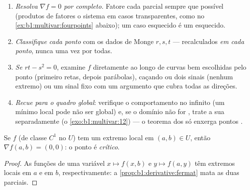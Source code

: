 \begin{method}
\label{met:b1:multivar:extremamethod}
\begin{enumerate}
  \item \emph{Resolva $\nabla f = 0$ por completo.} Fatore cada parcial sempre
        que possível (produtos de fatores   o sistema
        em casos transparentes, como no \cref{ex:b1:multivar:fourpoints} abaixo); um caso
        esquecido é um  esquecido.
  \item \emph{Classifique cada ponto} com os dados de Monge $r, s,
        t$ ---
        recalculados \emph{em cada ponto}, nunca uma vez por todas.
  \item \emph{Se $rt - s^2 = 0$}, examine $f$ diretamente ao longo de curvas
        bem escolhidas pelo ponto (primeiro retas, depois parábolas),
        caçando ou dois sinais (nenhum extremo) ou um sinal fixo com
        um argumento que cubra todas as direções.
  \item \emph{Recue para o quadro global}: verifique o comportamento
        no infinito (um mínimo local pode não ser global) e, se o
        domínio não for , trate a sua  separadamente
        (o \cref{exo:b1:multivar:12}) --- o teorema dos  só enxerga pontos
        .
\end{enumerate}
\end{method}

\begin{theorem}\label{thm:b1:multivar:critical}
Se $f$ (de classe $C^1$ no  $U$) tem um extremo local em $(a,b)
\in U$,
então $\nabla f(a,b) = (0,0)$: o ponto é \emph{crítico}.
\end{theorem}

\begin{proof}
As funções de uma variável $x \mapsto f(x, b)$ e $y \mapsto f(a,
y)$ têm extremos locais
 em $a$ e em $b$, respectivamente: a \cref{prop:b1:derivative:fermat} mata as duas
parciais.
\end{proof}

